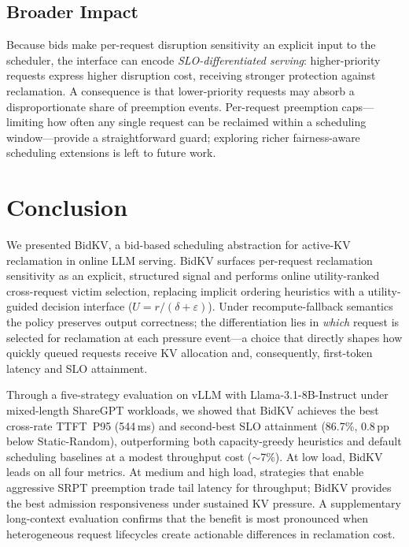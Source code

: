 \documentclass[sigconf,nonacm]{acmart}
\newcommand{\bidkv}{BidKV\xspace}
\newcommand{\utilfn}{\ensuremath{U}}
\newcommand{\tokfree}{\ensuremath{r}}
\newcommand{\qualdelta}{\ensuremath{\delta}}
\newcommand{\stabeps}{\ensuremath{\varepsilon}}
\begin{document}
\subsection{Broader Impact}

Because bids make per-request disruption sensitivity an explicit input to the
scheduler, the interface can encode \emph{SLO-differentiated serving}:
higher-priority requests express higher disruption cost, receiving stronger
protection against reclamation.  A consequence is that lower-priority requests
may absorb a disproportionate share of preemption events.  Per-request
preemption caps---limiting how often any single request can be reclaimed within
a scheduling window---provide a straightforward guard; exploring richer
fairness-aware scheduling extensions is left to future work.

\section{Conclusion}\label{sec:conclusion}

We presented \bidkv, a bid-based scheduling abstraction for active-KV
reclamation in online LLM serving.  \bidkv surfaces per-request reclamation
sensitivity as an explicit, structured signal and performs online
utility-ranked cross-request victim selection, replacing implicit ordering
heuristics
with a utility-guided decision interface
($\utilfn = \tokfree / (\qualdelta + \stabeps)$).  Under recompute-fallback
semantics the policy preserves output correctness; the differentiation lies
in \emph{which} request is selected for reclamation at each pressure
event---a choice that directly shapes how quickly queued requests receive KV
allocation and, consequently, first-token latency and SLO attainment.

Through a five-strategy evaluation on vLLM with Llama-3.1-8B-Instruct under
mixed-length ShareGPT workloads, we showed that \bidkv achieves the best cross-rate TTFT~P95 (544\,ms) and
second-best SLO attainment (86.7\%, 0.8\,pp below Static-Random),
outperforming both capacity-greedy heuristics and default scheduling
baselines at a modest throughput cost (${\sim}$7\%).  At low load, \bidkv leads on all four metrics.
At medium and high load, strategies that enable aggressive SRPT preemption
trade tail latency for throughput; \bidkv provides the best admission
responsiveness under sustained KV pressure.  A supplementary long-context
evaluation confirms that the benefit is most pronounced when heterogeneous
request lifecycles create actionable differences in reclamation cost.
\end{document}
